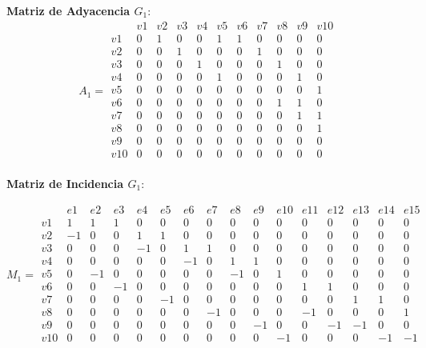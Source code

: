 \documentclass{article}
\begin{document}
\textbf{Matriz de Adyacencia \( G_1 \)}:
\[
A_1 =
\begin{array}{c|cccccccccc}
    & v1 & v2 & v3 & v4 & v5 & v6 & v7 & v8 & v9 & v10 \\
\hline
v1 & 0 & 1 & 0 & 0 & 1 & 1 & 0 & 0 & 0 & 0 \\
v2 & 0 & 0 & 1 & 0 & 0 & 0 & 1 & 0 & 0 & 0 \\
v3 & 0 & 0 & 0 & 1 & 0 & 0 & 0 & 1 & 0 & 0 \\
v4 & 0 & 0 & 0 & 0 & 1 & 0 & 0 & 0 & 1 & 0 \\
v5 & 0 & 0 & 0 & 0 & 0 & 0 & 0 & 0 & 0 & 1 \\
v6 & 0 & 0 & 0 & 0 & 0 & 0 & 0 & 1 & 1 & 0 \\
v7 & 0 & 0 & 0 & 0 & 0 & 0 & 0 & 0 & 1 & 1 \\
v8 & 0 & 0 & 0 & 0 & 0 & 0 & 0 & 0 & 0 & 1 \\
v9 & 0 & 0 & 0 & 0 & 0 & 0 & 0 & 0 & 0 & 0 \\
v10& 0 & 0 & 0 & 0 & 0 & 0 & 0 & 0 & 0 & 0 \\
\end{array}
\]


\textbf{Matriz de Incidencia \( G_1 \)}:

\setcounter{MaxMatrixCols}{20}
\[
M_1 =
\begin{array}{c|ccccccccccccccc}
    & e1 & e2 & e3 & e4 & e5 & e6 & e7 & e8 & e9 & e10 & e11 & e12 & e13 & e14 & e15 \\
\hline
v1 & 1  & 1  & 1  & 0  & 0  & 0  & 0  & 0  & 0  & 0  & 0  & 0  & 0  & 0  & 0   \\
v2 & -1 & 0  & 0  & 1  & 1  & 0  & 0  & 0  & 0  & 0  & 0  & 0  & 0  & 0  & 0   \\
v3 & 0  & 0  & 0  & -1 & 0  & 1  & 1  & 0  & 0  & 0  & 0  & 0  & 0  & 0  & 0   \\
v4 & 0  & 0  & 0  & 0  & 0  & -1 & 0  & 1  & 1  & 0  & 0  & 0  & 0  & 0  & 0   \\
v5 & 0  & -1 & 0  & 0  & 0  & 0  & 0  & -1 & 0  & 1  & 0  & 0  & 0  & 0  & 0   \\
v6 & 0  & 0  & -1 & 0  & 0  & 0  & 0  & 0  & 0  & 0  & 1  & 1  & 0  & 0  & 0   \\
v7 & 0  & 0  & 0  & 0  & -1 & 0  & 0  & 0  & 0  & 0  & 0  & 0  & 1  & 1  & 0   \\
v8 & 0  & 0  & 0  & 0  & 0  & 0  & -1 & 0  & 0  & 0  & -1 & 0  & 0  & 0  & 1   \\
v9 & 0  & 0  & 0  & 0  & 0  & 0  & 0  & 0  & -1 & 0  & 0  & -1 & -1 & 0  & 0   \\
v10& 0  & 0  & 0  & 0  & 0  & 0  & 0  & 0  & 0  & -1 & 0  & 0  & 0  & -1 & -1  \\
\end{array}
\]
\end{document}
